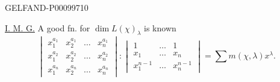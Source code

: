 \begin{GelfandAdjacentEvidence}{GELFAND-P000997}{10}


\underline{I. M. G.} A good fn. for $\dim L(\chi)_\lambda$ is known
\[
\begin{vmatrix}
x_1^{a_1}&x_2^{a_1}&\ldots&x_n^{a_1}\\
x_1^{a_2}&x_2^{a_2}&\ldots&x_n^{a_2}\\
x_1^{a_n}&x_2^{a_n}&\ldots&x_n^{a_n}
\end{vmatrix}
:
\begin{vmatrix}
1&\ldots&1\\
x_1&\ldots&x_n\\
x_1^{n-1}&\ldots&x_n^{n-1}
\end{vmatrix}
=\sum m(\chi,\lambda)x^\lambda.
\]
\end{GelfandAdjacentEvidence}



